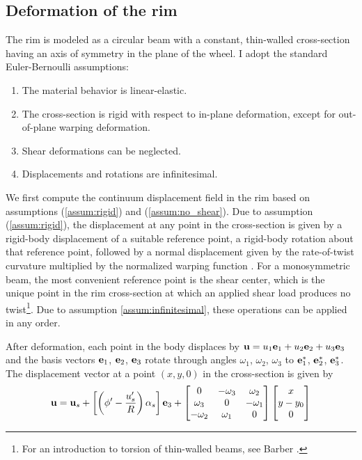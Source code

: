 \documentclass[\rootdir/thesis.tex]{subfiles}
\begin{document}
\subsection{Deformation of the rim}

The rim is modeled as a circular beam with a constant, thin-walled cross-section having an axis of symmetry in the plane of the wheel. I adopt the standard Euler-Bernoulli assumptions:

\begin{enumerate}
	\item{The material behavior is linear-elastic.}\label{assum:elastic}
	\item{The cross-section is rigid with respect to in-plane deformation, except for out-of-plane warping deformation.}\label{assum:rigid}
	\item{Shear deformations can be neglected.}\label{assum:no_shear} 
	\item{Displacements and rotations are infinitesimal.}\label{assum:infinitesimal}
\end{enumerate}

We first compute the continuum displacement field in the rim based on assumptions (\ref{assum:rigid}) and (\ref{assum:no_shear}). Due to assumption (\ref{assum:rigid}), the displacement at any point in the cross-section is given by a rigid-body displacement of a suitable reference point, a rigid-body rotation about that reference point, followed by a normal displacement given by the rate-of-twist curvature multiplied by the normalized warping function \cite{warping mechanics}. For a monosymmetric beam, the most convenient reference point is the shear center, which is the unique point in the rim cross-section at which an applied shear load produces no twist\footnote{For an introduction to torsion of thin-walled beams, see Barber \cite{Barber}.}. Due to assumption \ref{assum:infinitesimal}, these operations can be applied in any order.

After deformation, each point in the body displaces by $\mathbf{u}= u_1\mathbf{e}_1 + u_2\mathbf{e}_2 + u_3\mathbf{e}_3$ and the basis vectors $\mathbf{e}_1$, $\mathbf{e}_2$, $\mathbf{e}_3$ rotate through angles $\omega_1$, $\omega_2$, $\omega_3$ to $\mathbf{e}_1^*$, $\mathbf{e}_2^*$, $\mathbf{e}_3^*$. The displacement vector at a point $(x, y, 0)$ in the cross-section is given by
\begin{equation}
\label{eq:u}
\mathbf{u} = \mathbf{u}_s + \left[\left(\phi' - \frac{u_s'}{R}\right)\alpha_s\right]\mathbf{e}_3 +
\begin{bmatrix}
0        & -\omega_3& \omega_2\\
\omega_3 & 0        & -\omega_1\\
-\omega_2& \omega_1 & 0
\end{bmatrix}
\begin{bmatrix}x\\y - y_0\\0\end{bmatrix}
\end{equation}
\end{document}
